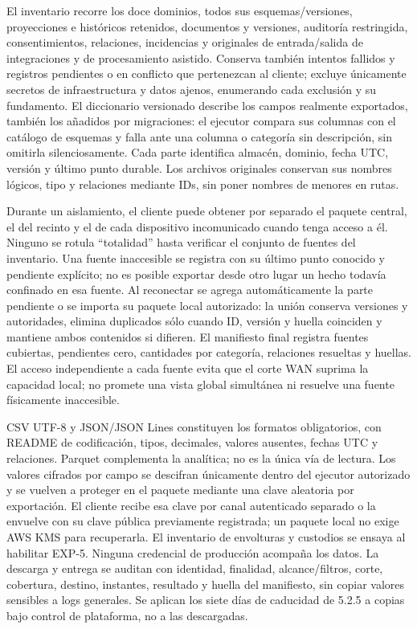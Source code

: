 El inventario recorre los doce dominios, todos sus esquemas/versiones, proyecciones e históricos retenidos, documentos y versiones, auditoría restringida, consentimientos, relaciones, incidencias y originales de entrada/salida de integraciones y de procesamiento asistido. Conserva también intentos fallidos y registros pendientes o en conflicto que pertenezcan al cliente; excluye únicamente secretos de infraestructura y datos ajenos, enumerando cada exclusión y su fundamento. El diccionario versionado describe los campos realmente exportados, también los añadidos por migraciones: el ejecutor compara sus columnas con el catálogo de esquemas y falla ante una columna o categoría sin descripción, sin omitirla silenciosamente. Cada parte identifica almacén, dominio, fecha UTC, versión y último punto durable. Los archivos originales conservan sus nombres lógicos, tipo y relaciones mediante IDs, sin poner nombres de menores en rutas.

Durante un aislamiento, el cliente puede obtener por separado el paquete central, el del recinto y el de cada dispositivo incomunicado cuando tenga acceso a él. Ninguno se rotula ``totalidad'' hasta verificar el conjunto de fuentes del inventario. Una fuente inaccesible se registra con su último punto conocido y pendiente explícito; no es posible exportar desde otro lugar un hecho todavía confinado en esa fuente. Al reconectar se agrega automáticamente la parte pendiente o se importa su paquete local autorizado: la unión conserva versiones y autoridades, elimina duplicados sólo cuando ID, versión y huella coinciden y mantiene ambos contenidos si difieren. El manifiesto final registra fuentes cubiertas, pendientes cero, cantidades por categoría, relaciones resueltas y huellas. El acceso independiente a cada fuente evita que el corte WAN suprima la capacidad local; no promete una vista global simultánea ni resuelve una fuente físicamente inaccesible.

CSV UTF-8 y JSON/JSON Lines constituyen los formatos obligatorios, con README de codificación, tipos, decimales, valores ausentes, fechas UTC y relaciones. Parquet complementa la analítica; no es la única vía de lectura. Los valores cifrados por campo se descifran únicamente dentro del ejecutor autorizado y se vuelven a proteger en el paquete mediante una clave aleatoria por exportación. El cliente recibe esa clave por canal autenticado separado o la envuelve con su clave pública previamente registrada; un paquete local no exige AWS KMS para recuperarla. El inventario de envolturas y custodios se ensaya al habilitar EXP-5. Ninguna credencial de producción acompaña los datos. La descarga y entrega se auditan con identidad, finalidad, alcance/filtros, corte, cobertura, destino, instantes, resultado y huella del manifiesto, sin copiar valores sensibles a logs generales. Se aplican los siete días de caducidad de 5.2.5 a copias bajo control de plataforma, no a las descargadas.

